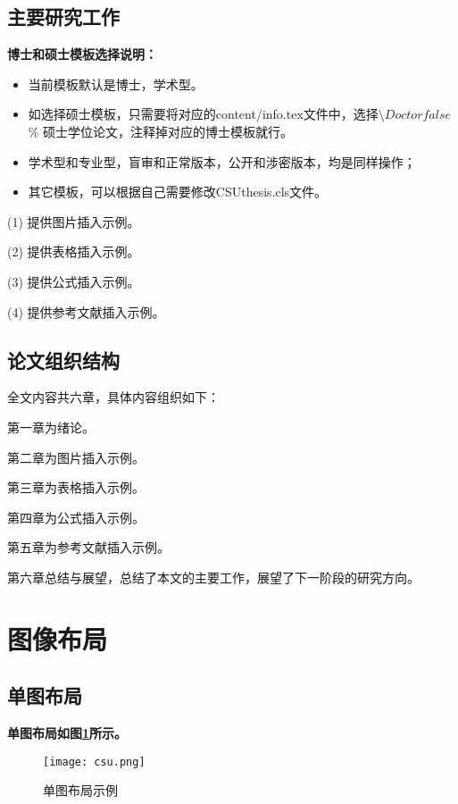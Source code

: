 \subsection{主要研究工作}
\textbf{博士和硕士模板选择说明：}
\begin{itemize}
	\item 当前模板默认是博士，学术型。
	\item 如选择硕士模板，只需要将对应的content/info.tex文件中，选择$\setminus Doctorfalse$ \% 硕士学位论文，注释掉对应的博士模板就行。
	\item 学术型和专业型，盲审和正常版本，公开和涉密版本，均是同样操作；
	\item 其它模板，可以根据自己需要修改CSUthesis.cls文件。
\end{itemize}

(1) 提供图片插入示例。

(2) 提供表格插入示例。

(3) 提供公式插入示例。

(4) 提供参考文献插入示例。

\subsection{论文组织结构}

全文内容共六章，具体内容组织如下：

第一章为绪论。

第二章为图片插入示例。

第三章为表格插入示例。

第四章为公式插入示例。

第五章为参考文献插入示例。

第六章总结与展望，总结了本文的主要工作，展望了下一阶段的研究方向。

\clearpage

\section{图像布局}


\subsection{单图布局}



\textbf{单图布局如图\ref{F.csu_single}所示。}

\begin{figure}[hbt]
\centering
\texttt{[image: csu.png]}
\caption{单图布局示例}
\label{F.csu_single}
\end{figure}

